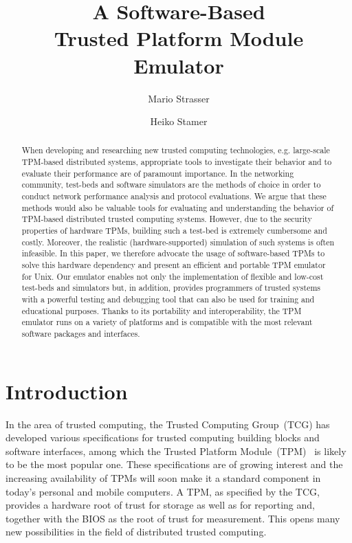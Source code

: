 \documentclass[runningheads]{llncs}
\title{A Software-Based\\ Trusted Platform Module Emulator}
\author{Mario Strasser\inst{1} \and Heiko Stamer\inst{2}}
\institute{
	ETH Zurich, Switzerland\\
	\email{strasser@tik.ee.ethz.ch}\\[3mm]
\and
	Fachbereich Elektrotechnik/Informatik, Universit\"at Kassel\\
	34109 Kassel, Germany\\
	\email{stamer@theory.informatik.uni-kassel.de}\\
}
\date{}
\begin{document}
\maketitle

\begin{abstract}
	When developing and researching new trusted computing technologies, e.g.
	large-scale TPM-based distributed systems, appropriate tools to investigate
	their behavior and to evaluate their performance are of paramount
	importance. In the networking community, test-beds and software simulators
	are the methods of choice in order to conduct network performance analysis
	and protocol evaluations. We argue that these methods would also be valuable
	tools for evaluating and understanding the behavior of TPM-based distributed
	trusted computing systems. However, due to the security properties of
	hardware TPMs, building such a test-bed is extremely cumbersome and costly.
	Moreover, the realistic (hardware-supported) simulation of such systems is
	often infeasible. In this paper, we therefore advocate the usage of
	software-based TPMs to solve this hardware dependency and present an
	efficient and portable TPM emulator for Unix. Our emulator enables not only
	the implementation of flexible and low-cost test-beds and simulators but,
	in addition, provides programmers of trusted systems with a powerful testing
	and debugging tool that can also be used for training and educational
	purposes. Thanks to its portability and interoperability, the TPM emulator
	runs on a variety of platforms and is compatible with the most relevant
	software packages and interfaces.
\end{abstract}


\section{Introduction}
In the area of trusted computing, the Trusted Computing Group~(TCG) has
developed various specifications for trusted computing building blocks and
software interfaces, among which the Trusted Platform Module~(TPM)~\cite{TPM}
is likely to be the most popular one. These specifications are of growing
interest and the increasing availability of TPMs will soon make it a standard
component in today's personal and mobile computers. A TPM, as specified by the
TCG, provides a hardware root of trust for storage as well as for reporting
and, together with the BIOS as the root of trust for measurement. This opens
many new possibilities in the field of distributed trusted computing.
\end{document}

